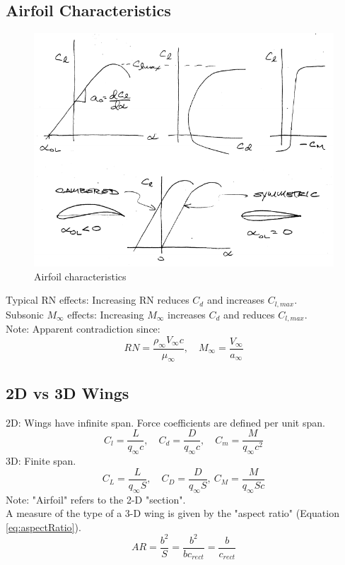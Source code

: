 \documentclass[draft=false, titlepage]{article}
\begin{document}
\subsection{Airfoil Characteristics}
\begin{figure}[ht]
	\centering
	\includegraphics[width=0.7\linewidth]{Figures/p40_airfoilCharacteristics.PNG}
	\caption{Airfoil characteristics}
	\label{fig:p40_airfoilCharacteristics}
\end{figure}
Typical RN effects: Increasing RN reduces $C_d$ and increases $C_{l,max}$.\\
Subsonic $M_\infty$ effects: Increasing $M_\infty$ increases $C_d$ and reduces $C_{l,max}$.\\
Note: Apparent contradiction since:
\begin{equation*}
RN = \frac{\rho_\infty V_\infty c}{\mu_\infty},\quad M_\infty = \frac{V_\infty}{a_\infty}
\end{equation*}

\subsection{2D vs 3D Wings}
2D: Wings have infinite span. Force coefficients are defined per unit span.
\begin{equation}
C_l = \frac{L}{q_\infty c},\quad C_d = \frac{D}{q_\infty c},\quad C_m = \frac{M}{q_\infty c^2}
\label{eq:2DCoefficients}
\end{equation}
3D: Finite span.
\begin{equation}
C_L = \frac{L}{q_\infty S},\quad C_D = \frac{D}{q_\infty S},\ C_M = \frac{M}{q_\infty Sc}
\label{eq:3DCoefficients}
\end{equation}
Note: "Airfoil" refers to the 2-D "section".\\
A measure of the type of a 3-D wing is given by the "aspect ratio" (Equation \ref{eq:aspectRatio}).
\begin{equation}
AR = \frac{b^2}{S} = \frac{b^2}{bc_{rect}} = \frac{b}{c_{rect}}
\label{eq:aspectRatio}
\end{equation}
\end{document}
